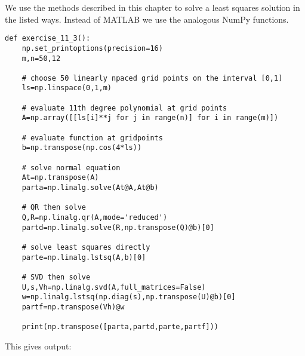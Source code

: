 \documentclass[10pt]{article}
\begin{document}
\begin{solution}[Solution]
We use the methods described in this chapter to solve a least squares solution in the listed ways. Instead of MATLAB we use the analogous NumPy functions.
\begin{lstlisting}
def exercise_11_3():
    np.set_printoptions(precision=16)
    m,n=50,12
    
    # choose 50 linearly npaced grid points on the interval [0,1]
    ls=np.linspace(0,1,m)
    
    # evaluate 11th degree polynomial at grid points
    A=np.array([[ls[i]**j for j in range(n)] for i in range(m)])

    # evaluate function at gridpoints
    b=np.transpose(np.cos(4*ls))
    
    # solve normal equation
    At=np.transpose(A)
    parta=np.linalg.solve(At@A,At@b)
    
    # QR then solve
    Q,R=np.linalg.qr(A,mode='reduced')
    partd=np.linalg.solve(R,np.transpose(Q)@b)[0]
    
    # solve least squares directly
    parte=np.linalg.lstsq(A,b)[0]

    # SVD then solve
    U,s,Vh=np.linalg.svd(A,full_matrices=False)
    w=np.linalg.lstsq(np.diag(s),np.transpose(U)@b)[0]
    partf=np.transpose(Vh)@w
    
    print(np.transpose([parta,partd,parte,partf]))
\end{lstlisting}

This gives output:


\end{solution}
\end{document}
